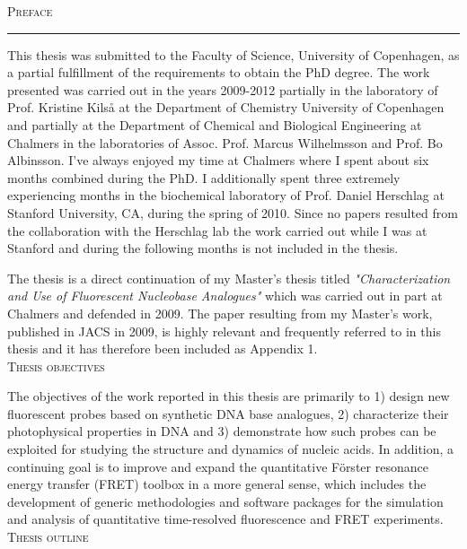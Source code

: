 \thispagestyle{empty}
\vspace*{3cm}
\noindent\Huge\textsc{Preface}\\
\normalsize
\noindent\rule[2pt]{\textwidth}{0.8pt}
\hspace*{3cm}

 This thesis was submitted to the Faculty of Science, University of Copenhagen, as a partial fulfillment of the requirements to obtain the PhD degree. The work presented was carried out in the years 2009-2012 partially in the laboratory of Prof. Kristine Kilså at the Department of Chemistry University of Copenhagen and partially at the Department of Chemical and Biological Engineering at Chalmers in the laboratories of Assoc. Prof. Marcus Wilhelmsson and Prof. Bo Albinsson. I've always enjoyed my time at Chalmers where I spent about six months combined during the PhD. I additionally spent three extremely experiencing months in the biochemical laboratory of Prof. Daniel Herschlag at Stanford University, CA, during the spring of 2010. Since no papers resulted from the collaboration with the Herschlag lab the work carried out while I was at Stanford and during the following months is not included in the thesis.

 The thesis is a direct continuation of my Master's thesis titled \emph{"Characterization and Use of Fluorescent Nucleobase Analogues"} which was carried out in part at Chalmers and defended in 2009. The paper resulting from my Master's work, published in JACS in 2009, is highly relevant and frequently referred to in this thesis and it has therefore been included as Appendix 1.\\

\Large\textsc{Thesis objectives}\normalsize

 The objectives of the work reported in this thesis are primarily to 1) design new fluorescent probes based on synthetic DNA base analogues, 2) characterize their photophysical properties in DNA and 3) demonstrate how such probes can be exploited for studying the structure and dynamics of nucleic acids. In addition, a continuing goal is to improve and expand the quantitative Förster resonance energy transfer (FRET) toolbox in a more general sense, which includes the development of generic methodologies and software packages for the simulation and analysis of quantitative time-resolved fluorescence and FRET experiments.\\

\newpage
\Large\textsc{Thesis outline}\normalsize

